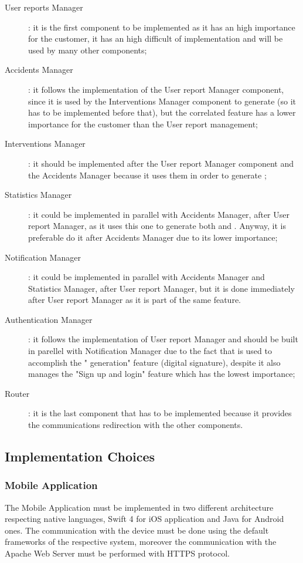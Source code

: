 \documentclass[../DD.tex]{subfiles}
\begin{document}
\begin{description}
	\item[User reports Manager]: it is the first component to be implemented as it has an high importance for the customer, it has an high difficult of implementation and will be used by many other components;
	\item[Accidents Manager]: it follows the implementation of the User report Manager component, since it is used by the Interventions Manager component to generate  (so it has to be implemented before that), but the correlated feature has a lower importance for the customer than the User report management;
	\item[Interventions Manager]: it should be implemented after the User report Manager component and the Accidents Manager because it uses them in order to generate ;
	\item[Statistics Manager]: it could be implemented in parallel with Accidents Manager, after User report Manager, as it uses this one to generate both  and . Anyway, it is preferable do it after Accidents Manager due to its lower importance;
	\item[Notification Manager]: it could be implemented in parallel with Accidents Manager and Statistics Manager, after User report Manager, but it is done immediately after User report Manager as it is part of the same feature.
	\item[Authentication Manager]: it follows the implementation of User report Manager and should be built in parellel with Notification Manager due to the fact that is used to accomplish the " generation" feature (digital signature), despite it also manages the "Sign up and login" feature which has the lowest importance;
	\item[Router]: it is the last component that has to be implemented because it provides the communications redirection with the other components.
	
\end{description}


\subsection{Implementation Choices\label{5.2.2}}

\subsubsection{Mobile Application}
The Mobile Application must be implemented in two different architecture respecting native languages, Swift 4 for iOS application and Java for Android ones. The communication with the device must be done using the default frameworks of the respective system, moreover the communication with the Apache Web Server must be performed with HTTPS protocol.
\end{document}
